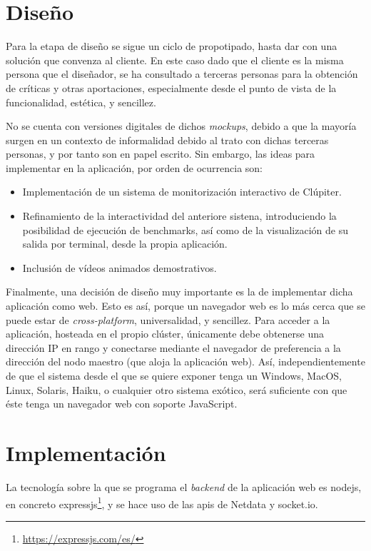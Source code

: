 \section{Diseño}
\label{sec:contenido_didactico__diseño}
Para la etapa de diseño se sigue un ciclo de propotipado, hasta dar con una solución que convenza al cliente. En este caso dado que el cliente es la misma persona que el diseñador, se ha consultado a terceras personas para la obtención de críticas y otras aportaciones, especialmente desde el punto de vista de la funcionalidad, estética, y sencillez.

No se cuenta con versiones digitales de dichos \textit{mockups}, debido a que la mayoría surgen en un contexto de informalidad debido al trato con dichas terceras personas, y por tanto son en papel escrito. Sin embargo, las ideas para implementar en la aplicación, por orden de ocurrencia son:

\begin{itemize}
  \item Implementación de un sistema de monitorización interactivo de Clúpiter.
  \item Refinamiento de la interactividad del anteriore sistena, introduciendo la posibilidad de ejecución de benchmarks, así como de la visualización de su salida por terminal, desde la propia aplicación.
  \item Inclusión de vídeos animados demostrativos.
\end{itemize}

Finalmente, una decisión de diseño muy importante es la de implementar dicha aplicación como web. Esto es así, porque un navegador web es lo más cerca que se puede estar de \textit{cross-platform}, universalidad, y sencillez. Para acceder a la aplicación, hosteada en el propio clúster, únicamente debe obtenerse una dirección IP en rango y conectarse mediante el navegador de preferencia a la dirección del nodo maestro (que aloja la aplicación web). Así, independientemente de que el sistema desde el que se quiere exponer tenga un Windows, MacOS, Linux, Solaris, Haiku, o cualquier otro sistema exótico, será suficiente con que éste tenga un navegador web con soporte JavaScript.

\section{Implementación}
La tecnología sobre la que se programa el \textit{\gls{backend}} de la aplicación web es nodejs, en concreto expressjs\footnote{\url{https://expressjs.com/es/}}, y se hace uso de las \acrshort{api}s de Netdata y socket.io.

